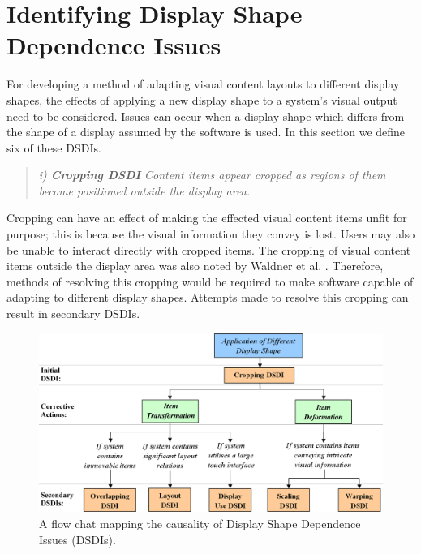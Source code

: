\documentclass[review,5p,times,twocolumn]{elsarticle}
\begin{document}
\section{Identifying Display Shape Dependence Issues}
\label{sec:problem}

For developing a method of adapting visual content layouts to different display shapes, the effects of applying a new display shape to a system's visual output need to be considered.
Issues can occur when a display shape which differs from the shape of a display assumed by the software is used.
In this section we define six of these \acp{DSDI}.

\begin{quote}\emph{i) \textbf{Cropping \ac{DSDI}} Content items appear cropped as regions of them become positioned outside the display area.}\end{quote}

Cropping can have an effect of making the effected visual content items unfit for purpose; this is because the visual information they convey is lost.
Users may also be unable to interact directly with cropped items.
The cropping of visual content items outside the display area was also noted by Waldner et al. \cite{Waldner2011}.
Therefore, methods of resolving this cropping would be required to make software capable of adapting to different display shapes.
Attempts made to resolve this cropping can result in secondary \acp{DSDI}.

 \begin{figure}[t]
 \centering
   \includegraphics[width=1\textwidth]{figures/dsdi_flow.png}
   \caption{A flow chat mapping the causality of Display Shape Dependence Issues (DSDIs).}
   \label{fig:dsdiFlow}
\end{figure}
\end{document}
